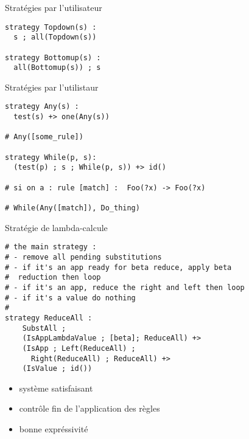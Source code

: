 \begin{frame}[fragile]{Stratégies par l'utilisateur}
\begin{verbatim}
strategy Topdown(s) :
  s ; all(Topdown(s))

strategy Bottomup(s) :
  all(Bottomup(s)) ; s
\end{verbatim}
\end{frame}

\begin{frame}[fragile]{Stratégies par l'utilistaur}
\begin{verbatim}
strategy Any(s) :
  test(s) +> one(Any(s))

# Any([some_rule])

strategy While(p, s):
  (test(p) ; s ; While(p, s)) +> id()

# si on a : rule [match] :  Foo(?x) -> Foo(?x)

# While(Any([match]), Do_thing)
\end{verbatim}

\end{frame}

\begin{frame}[fragile]{Stratégie de lambda-calcule}

\begin{verbatim}
# the main strategy : 
# - remove all pending substitutions
# - if it's an app ready for beta reduce, apply beta 
#  reduction then loop
# - if it's an app, reduce the right and left then loop
# - if it's a value do nothing
#
strategy ReduceAll :
    SubstAll ;
    (IsAppLambdaValue ; [beta]; ReduceAll) +>
    (IsApp ; Left(ReduceAll) ; 
      Right(ReduceAll) ; ReduceAll) +>
    (IsValue ; id())
\end{verbatim}

\end{frame}

\begin{frame}{}
\begin{itemize}
\item système satisfaisant
\item contrôle fin de l'application des règles
\item bonne expréssivité
\end{itemize}
\end{frame}
